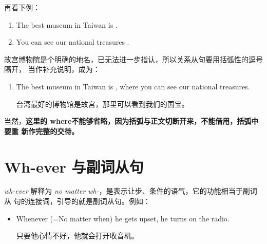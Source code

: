 再看下例：
\begin{enumerate}
\item   The best museum in Taiwan is  .
\item   You can see our national treasures .
\end{enumerate}
故宫博物院是个明确的地名，已无法进一步指认，所以关系从句要用括弧性的逗号隔开，
当作补充说明，成为：
\begin{enumerate}[resume]
\item The best museum in Taiwan is , where you
  can see our national treasures.

  台湾最好的博物馆是故宮，那里可以看到我们的国宝。
\end{enumerate}
当然，\textbf{这里的 where不能够省略，因为括弧与正文切断开来，不能借用，括弧中要重
  新作完整的交待。}

\section{Wh-ever 与副词从句}

\emph{wh-ever} 解释为 \emph{no matter wh-}，是表示让步、条件的语气，它的功能相当于副词从
句的连接词，引导的就是副词从句。例如：

\begin{itemize}
\item Whenever (=No matter when) he gets upset, he turns on the radio.

  只要他心情不好，他就会打开收音机。
\end{itemize}

